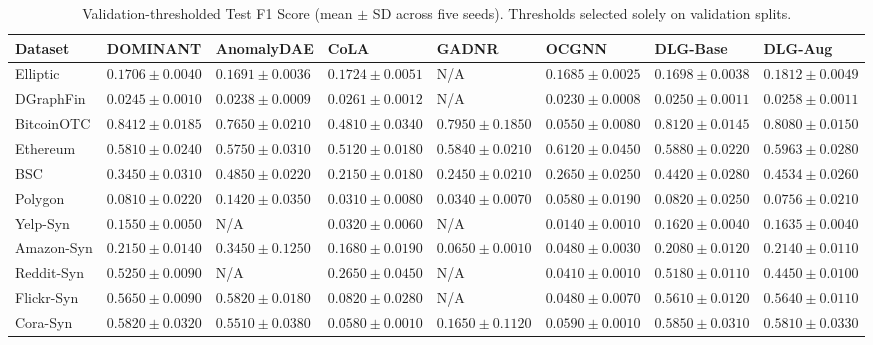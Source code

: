 \documentclass[applsci,article,submit,moreauthors,pdftex]{Definitions/mdpi}
\begin{document}
\begin{table}[H]
\centering\scriptsize\setlength{\tabcolsep}{1.5pt}
\caption{Validation-thresholded Test F1 Score (mean $\pm$ SD across five seeds). Thresholds selected solely on validation splits.}
\label{tab:app_f1_full}
\begin{tabularx}{\textwidth}{lXXXXXXX}\toprule
\textbf{Dataset} & \textbf{DOMINANT} & \textbf{AnomalyDAE} & \textbf{CoLA} & \textbf{GADNR} & \textbf{OCGNN} & \textbf{DLG-Base} & \textbf{DLG-Aug} \\\midrule
Elliptic & $0.1706 \pm 0.0040$ & $0.1691 \pm 0.0036$ & $0.1724 \pm 0.0051$ & N/A & $0.1685 \pm 0.0025$ & $0.1698 \pm 0.0038$ & $\mathbf{0.1812 \pm 0.0049}$ \\
DGraphFin & $0.0245 \pm 0.0010$ & $0.0238 \pm 0.0009$ & $\mathbf{0.0261 \pm 0.0012}$ & N/A & $0.0230 \pm 0.0008$ & $0.0250 \pm 0.0011$ & $0.0258 \pm 0.0011$ \\
BitcoinOTC & $\mathbf{0.8412 \pm 0.0185}$ & $0.7650 \pm 0.0210$ & $0.4810 \pm 0.0340$ & $0.7950 \pm 0.1850$ & $0.0550 \pm 0.0080$ & $0.8120 \pm 0.0145$ & $0.8080 \pm 0.0150$ \\
Ethereum & $0.5810 \pm 0.0240$ & $0.5750 \pm 0.0310$ & $0.5120 \pm 0.0180$ & $0.5840 \pm 0.0210$ & $\mathbf{0.6120 \pm 0.0450}$ & $0.5880 \pm 0.0220$ & $0.5963 \pm 0.0280$ \\
BSC & $0.3450 \pm 0.0310$ & $\mathbf{0.4850 \pm 0.0220}$ & $0.2150 \pm 0.0180$ & $0.2450 \pm 0.0210$ & $0.2650 \pm 0.0250$ & $0.4420 \pm 0.0280$ & $0.4534 \pm 0.0260$ \\
Polygon & $0.0810 \pm 0.0220$ & $\mathbf{0.1420 \pm 0.0350}$ & $0.0310 \pm 0.0080$ & $0.0340 \pm 0.0070$ & $0.0580 \pm 0.0190$ & $0.0820 \pm 0.0250$ & $0.0756 \pm 0.0210$ \\
Yelp-Syn & $0.1550 \pm 0.0050$ & N/A & $0.0320 \pm 0.0060$ & N/A & $0.0140 \pm 0.0010$ & $0.1620 \pm 0.0040$ & $\mathbf{0.1635 \pm 0.0040}$ \\
Amazon-Syn & $0.2150 \pm 0.0140$ & $\mathbf{0.3450 \pm 0.1250}$ & $0.1680 \pm 0.0190$ & $0.0650 \pm 0.0010$ & $0.0480 \pm 0.0030$ & $0.2080 \pm 0.0120$ & $0.2140 \pm 0.0110$ \\
Reddit-Syn & $\mathbf{0.5250 \pm 0.0090}$ & N/A & $0.2650 \pm 0.0450$ & N/A & $0.0410 \pm 0.0010$ & $0.5180 \pm 0.0110$ & $0.4450 \pm 0.0100$ \\
Flickr-Syn & $0.5650 \pm 0.0090$ & $\mathbf{0.5820 \pm 0.0180}$ & $0.0820 \pm 0.0280$ & N/A & $0.0480 \pm 0.0070$ & $0.5610 \pm 0.0120$ & $0.5640 \pm 0.0110$ \\
Cora-Syn & $0.5820 \pm 0.0320$ & $0.5510 \pm 0.0380$ & $0.0580 \pm 0.0010$ & $0.1650 \pm 0.1120$ & $0.0590 \pm 0.0010$ & $\mathbf{0.5850 \pm 0.0310}$ & $0.5810 \pm 0.0330$ \\

\end{tabularx}
\end{table}
\end{document}
